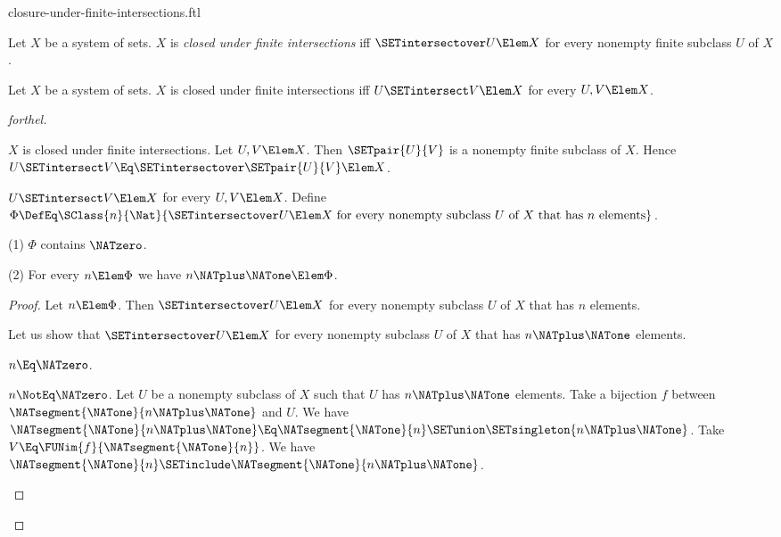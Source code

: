 \documentclass{stex}
\begin{document}
\begin{smodule}{closure-under-finite-intersections.ftl}

\begin{definition}[forthel,for=closed under finite intersections]
  Let $X$ be a system of sets.
  $X$ is \emph{closed under finite intersections} iff $\SETintersectover U \Elem X$ for every nonempty finite subclass $U$ of $X$.
\end{definition}

\begin{proposition}[forthel]
  Let $X$ be a system of sets.
  $X$ is closed under finite intersections iff $U \SETintersect V \Elem X$ for every $U, V \Elem X$.
\end{proposition}
\begin{proof}[forthel]
  \begin{case}{$X$ is closed under finite intersections.}
    Let $U, V \Elem X$.
    Then $\SETpair{U}{V}$ is a nonempty finite subclass of $X$.
    Hence $U \SETintersect V \Eq \SETintersectover \SETpair{U}{V} \Elem X$.
  \end{case}

  \begin{case}{$U \SETintersect V \Elem X$ for every $U, V \Elem X$.}
    Define $\Phi \DefEq \SClass{n}{\Nat}{\SETintersectover U \Elem X\text{ for every nonempty subclass }U\text{ of }X\text{ that has }n\text{ elements}}$.

    (1) $\Phi$ contains $\NATzero$.

    (2) For every $n \Elem \Phi$ we have $n \NATplus \NATone \Elem \Phi$.
    \begin{proof}
      Let $n \Elem \Phi$.
      Then $\SETintersectover U \Elem X$ for every nonempty subclass $U$ of $X$ that has $n$ elements.

      Let us show that $\SETintersectover U \Elem X$ for every nonempty subclass $U$ of $X$ that has $n \NATplus \NATone$ elements.

        \begin{case}{$n \Eq \NATzero$.} \end{case}

        \begin{case}{$n \NotEq \NATzero$.}
          Let $U$ be a nonempty subclass of $X$ such that $U$ has $n \NATplus \NATone$ elements.
          Take a bijection $f$ between $\NATsegment{\NATone}{n \NATplus \NATone}$ and $U$.
          We have $\NATsegment{\NATone}{n \NATplus \NATone} \Eq \NATsegment{\NATone}{n} \SETunion \SETsingleton{n \NATplus \NATone}$.
          Take $V \Eq \FUNim{f}{\NATsegment{\NATone}{n}}$.
          We have $\NATsegment{\NATone}{n} \SETinclude \NATsegment{\NATone}{n \NATplus \NATone}$.


\end{case}
\end{proof}
\end{case}
\end{proof}
\end{smodule}
\end{document}
